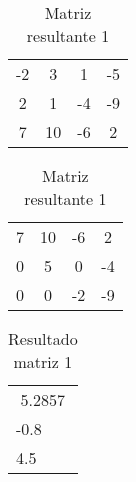 \documentclass[12pt]{article}
\begin{document}
\begin{table}[htb]
  \begin{minipage}[b]{.46\linewidth}

    \centering
    \begin{tabular}{|c c c|c|}
        -2           &          3           &          1      &   -5 \\
        2           &          1           &          -4      &   -9 \\
        7           &          10           &          -6     &   2 \\
    \end{tabular}
    \caption{Matriz de entrada 1}
    \label{tab:esq}

  \end{minipage}\hfill
  \begin{minipage}[b]{.46\linewidth}

    \centering
    \begin{tabular}{|c c c|c|}
        7           &          10           &          -6      &   2 \\
        0           &          5           &          0      &   -4 \\
        0           &          0           &          -2     &   -9 \\
    \end{tabular}
    \caption{Matriz resultante 1}
    \label{tab:dir}
  \end{minipage}
\end{table}


\begin{table}[!h]
\centering
\begin{tabular}{|l|}
\multicolumn{1}{|c|}{5.2857} \\
-0.8                         \\
4.5                         
\end{tabular}
\caption{Resultado matriz 1}
\end{table}

\end{document}
